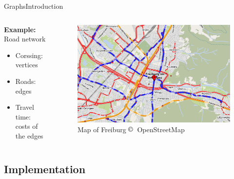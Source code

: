 \begin{frame}{Graphs}{Introduction}
  \begin{columns}
    \begin{column}{0.40\linewidth}
      \textbf{Example:} Road network
      \begin{itemize}
        \item
          Corssing: {\color{Mittel-Blau}vertices}
        \item
          Roads: {\color{Mittel-Blau}edges}
        \item
          Travel time:\\
          {\color{Mittel-Blau}costs of the edges}
      \end{itemize}
    \end{column}
    \begin{column}{0.6\linewidth}
      \begin{figure}[!h]
        \includegraphics[width=\linewidth]
          {Images/Graphs/Freiburg_OpenStreetMap.png}
        \caption{Map of Freiburg $\copyright$~OpenStreetMap}
        \label{fig:graphs:introduction_freiburg_osm}
      \end{figure}
    \end{column}
  \end{columns}
\end{frame}



\subsection{Implementation}

